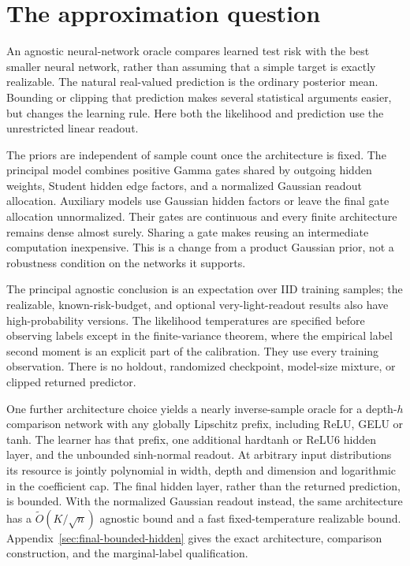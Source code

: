 \documentclass[11pt]{article}
\theoremstyle{remark}\newtheorem{remark}[theorem]{Remark}
\begin{document}
\section{The approximation question}
An agnostic neural-network oracle compares learned test risk with the
best smaller neural network, rather than assuming that a simple target
is exactly realizable. The natural real-valued prediction is the ordinary
posterior mean. Bounding or clipping that prediction makes several
statistical arguments easier, but changes the learning rule. Here both
the likelihood and prediction use the unrestricted linear readout.

The priors are independent of sample count once the architecture is fixed. The principal model combines positive Gamma gates shared by outgoing
hidden weights, Student hidden edge factors, and a normalized Gaussian
readout allocation. Auxiliary models use Gaussian hidden factors or
leave the final gate allocation unnormalized.
Their gates are continuous and every finite architecture remains dense
almost surely. Sharing a gate makes reusing an intermediate computation
inexpensive. This is a change from a product Gaussian prior, not a
robustness condition on the networks it supports.

The principal agnostic conclusion is an expectation over IID training samples; the realizable, known-risk-budget, and optional very-light-readout results also have high-probability versions. The
likelihood temperatures are specified before observing labels except in
the finite-variance theorem, where the empirical label second moment is
an explicit part of the calibration. They use every training observation.
There is no holdout, randomized checkpoint, model-size mixture, or
clipped returned predictor.

One further architecture choice yields a nearly inverse-sample oracle
for a depth-$h$ comparison network with any globally Lipschitz prefix,
including ReLU, GELU or tanh. The learner has that prefix, one additional
hardtanh or ReLU6 hidden layer, and the unbounded sinh-normal readout.
At arbitrary input distributions its resource is jointly polynomial in
width, depth and dimension and logarithmic in the coefficient cap.
The final hidden layer, rather than the returned prediction, is bounded.
With the normalized Gaussian readout instead, the same architecture
has a $\widetilde O(K/\sqrt n)$ agnostic bound and a fast
fixed-temperature realizable bound. Appendix~\ref{sec:final-bounded-hidden} gives the exact architecture,
comparison construction, and the marginal-label qualification.
\end{document}

